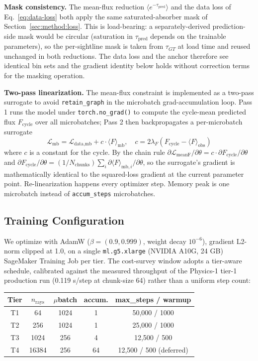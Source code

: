 \textbf{Mask consistency.} The mean-flux reduction $\langle e^{-\tau_{\text{pred}}}\rangle$ and the data loss of Eq.~\ref{eq:data-loss} both apply the same saturated-absorber mask of Section~\ref{sec:method:loss}. This is load-bearing: a separately-derived prediction-side mask would be circular (saturation in $\tau_{\text{pred}}$ depends on the trainable parameters), so the per-sightline mask is taken from $\tau_{GT}$ at load time and reused unchanged in both reductions. The data loss and the anchor therefore see identical bin sets and the gradient identity below holds without correction terms for the masking operation.

\textbf{Two-pass linearization.} The mean-flux constraint is implemented as a two-pass surrogate to avoid \texttt{retain\_graph} in the microbatch grad-accumulation loop. Pass 1 runs the model under \texttt{torch.no\_grad()} to compute the cycle-mean predicted flux $F_{\text{cycle}}$ over all microbatches; Pass 2 then backpropagates a per-microbatch surrogate
\begin{equation*}
\mathcal{L}_{\text{mb}} = \mathcal{L}_{\text{data,mb}} + c \cdot \langle F\rangle_{\text{mb}}, \quad c = 2 \lambda_F (F_{\text{cycle}} - \langle F\rangle_{\text{obs}})
\end{equation*}
where $c$ is a constant for the cycle. By the chain rule $\partial \mathcal{L}_{\text{meanF}}/\partial \theta = c \cdot \partial F_{\text{cycle}}/\partial \theta$ and $\partial F_{\text{cycle}}/\partial \theta = (1/N_{\text{chunks}}) \sum_i \partial \langle F\rangle_{\text{mb},i}/\partial \theta$, so the surrogate's gradient is mathematically identical to the squared-loss gradient at the current parameter point. Re-linearization happens every optimizer step. Memory peak is one microbatch instead of \texttt{accum\_steps} microbatches.

\subsection{Training Configuration}
We optimize with AdamW ($\beta = (0.9, 0.999)$, weight decay $10^{-6}$), gradient L2-norm clipped at 1.0, on a single \texttt{ml.g5.xlarge} (NVIDIA A10G, 24 GB) SageMaker Training Job per tier. The cost-survey window adopts a tier-aware schedule, calibrated against the measured throughput of the Physics-1 tier-1 production run (0.119 s/step at chunk-size 64) rather than a uniform step count:

\begin{center}
\renewcommand{\arraystretch}{1.1}
\begin{tabular}{c|c|c|c|c}
Tier & $n_{\text{rays}}$ & $\mu$batch & accum. & max\_steps / warmup \\
\hline
T1 & 64    & 1024 & 1  & 50{,}000 / 1000 \\
T2 & 256   & 1024 & 1  & 25{,}000 / 1000 \\
T3 & 1024  & 256  & 4  & 12{,}500 / 500 \\
T4 & 16384 & 256  & 64 & 12{,}500 / 500 (deferred) \\
\end{tabular}
\end{center}

